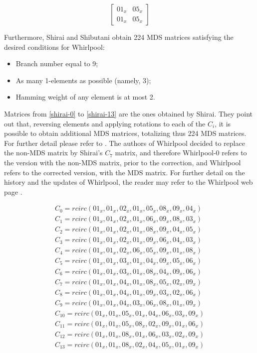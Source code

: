 \begin{equation}\label{mat:singular-whirlpool}
\begin{bmatrix}
  01_x & 05_x\\
  01_x & 05_x
\end{bmatrix}
\end{equation}

Furthermore, Shirai and Shibutani obtain 224 MDS matrices satisfying the desired conditions for Whirlpool:
\begin{itemize}
  \item Branch number equal to 9;
  \item As many 1-elements as possible (namely, 3);
  \item Hamming weight of any element is at most 2.
\end{itemize}

Matrices from \eqref{shirai-0} to \eqref{shirai-13} are the ones obtained by Shirai. They point out that, reversing elements and applying rotations to each of the $C_i$, it is possible to obtain additional MDS matrices, totalizing thus 224 MDS matrices. For further detail please refer to \cite{Shirai2003}. The authors of Whirlpool decided to replace the non-MDS matrix by Shirai's $C_7$ matrix, and therefore Whirlpool-0 refers to the version with the non-MDS matrix, prior to the correction, and Whirlpool refers to the corrected version, with the MDS matrix. For further detail on the history and the updates of Whirlpool, the reader may refer to the Whirlpool web page \cite{WhirlpoolWebPage}.

\begin{gather}
C_0 = rcirc(01_x, 01_x, 02_x, 01_x, 05_x, 08_x, 09_x, 04_x)\label{shirai-0}\\
C_1 = rcirc(01_x, 01_x, 02_x, 01_x, 06_x, 09_x, 08_x, 03_x)\label{shirai-1}\\
C_2 = rcirc(01_x, 01_x, 02_x, 01_x, 08_x, 09_x, 04_x, 05_x)\label{shirai-2}\\
C_3 = rcirc(01_x, 01_x, 02_x, 01_x, 09_x, 06_x, 04_x, 03_x)\label{shirai-3}\\
C_4 = rcirc(01_x, 01_x, 02_x, 06_x, 05_x, 09_x, 01_x, 08_x)\label{shirai-4}\\
C_5 = rcirc(01_x, 01_x, 03_x, 01_x, 04_x, 09_x, 05_x, 06_x)\label{shirai-5}\\
C_6 = rcirc(01_x, 01_x, 03_x, 01_x, 08_x, 04_x, 09_x, 06_x)\label{shirai-6}\\
C_7 = rcirc(01_x, 01_x, 04_x, 01_x, 08_x, 05_x, 02_x, 09_x)\label{shirai-7}\\
C_8 = rcirc(01_x, 01_x, 04_x, 01_x, 09_x, 03_x, 02_x, 06_x)\label{shirai-8}\\
C_9 = rcirc(01_x, 01_x, 04_x, 03_x, 06_x, 08_x, 01_x, 09_x)\label{shirai-9}\\
C_{10} = rcirc(01_x, 01_x, 05_x, 01_x, 04_x, 06_x, 03_x, 09_x)\label{shirai-10}\\
C_{11} = rcirc(01_x, 01_x, 05_x, 08_x, 02_x, 09_x, 01_x, 06_x)\label{shirai-11}\\
C_{12} = rcirc(01_x, 01_x, 08_x, 01_x, 06_x, 03_x, 02_x, 09_x)\label{shirai-12}\\
C_{13} = rcirc(01_x, 01_x, 08_x, 02_x, 04_x, 05_x, 01_x, 09_x)\label{shirai-13}
\end{gather}

